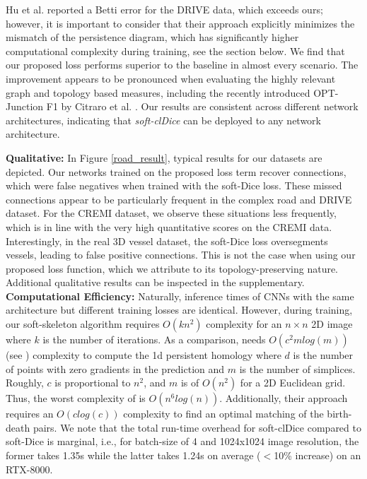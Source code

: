 Hu et al. reported a Betti error for the DRIVE data, which exceeds ours; however, it is important to consider that their approach explicitly minimizes the mismatch of the persistence diagram, which has significantly higher computational complexity during training, see the section below.
We find that our proposed loss performs superior to the baseline in almost every scenario. The improvement appears to be pronounced when evaluating the highly relevant graph and topology based measures, including the recently introduced OPT-Junction F1 by Citraro et al. \cite{citrarotowards}.  Our results are consistent across different network architectures, indicating that \textit{soft-clDice} can be deployed to any network architecture.

\noindent\textbf{Qualitative: }In Figure \ref{road_result}, typical results for our datasets are depicted. Our networks trained on the proposed loss term recover connections, which were false negatives when trained with the soft-Dice loss. These missed connections appear to be particularly frequent in the complex road and DRIVE dataset. For the CREMI dataset, we observe these situations less frequently, which is in line with the very high quantitative scores on the CREMI data. 
Interestingly, in the real 3D vessel dataset, the soft-Dice loss oversegments vessels, leading to false positive connections. This is not the case when using our proposed loss function, which we attribute to its topology-preserving nature. Additional qualitative results can be inspected in the supplementary.\\

\noindent\textbf{Computational Efficiency: }Naturally, inference times of CNNs with the same architecture but different training losses are identical. However, during training, our soft-skeleton algorithm requires $O(kn^2)$ complexity for an $n\times n$ 2D image where $k$ is the number of iterations. As a comparison, \cite{hu2019topology} needs $O(c^2mlog(m))$ (see \cite{han2003topology}) complexity to compute the 1d persistent homology where $d$ is the number of points with zero gradients in the prediction and $m$ is the number of simplices. Roughly, $c$ is proportional to $n^2$, and $m$ is of $O(n^2)$ for a 2D Euclidean grid. Thus, the worst complexity of \cite{hu2019topology} is $O(n^6log(n))$. 
Additionally, their approach requires an $O(clog(c))$ complexity to find an optimal matching of the birth-death pairs. We note that the total run-time overhead for soft-clDice compared to soft-Dice is marginal, i.e., for batch-size of 4 and 1024x1024 image resolution, the former takes 1.35s while the latter takes 1.24s on average ($<$10\% increase) on an RTX-8000.\\

